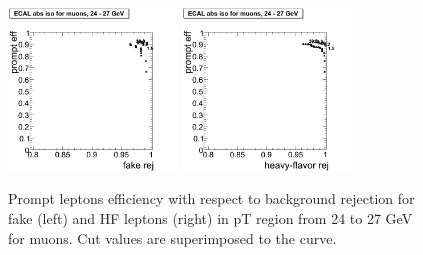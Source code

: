 \begin{figure}[htbp]
\begin{center}
 \includegraphics[width = 0.4\textwidth]{pictures/trackCut/bkgdRej_sigEff/muon_fake_ptCut7_ptCut8.png}
\includegraphics[width = 0.4\textwidth]{pictures/trackCut/bkgdRej_sigEff/muon_nonPrompt_ptCut7_ptCut8.png}
\caption{\small{Prompt leptons efficiency with respect to background 
rejection for fake (left) and HF leptons (right) in pT region
from 24 to 27 GeV for muons. 
Cut values are superimposed to the curve.}\label{fig:ecalrej_mu8}}
\end{center}
\end{figure}

